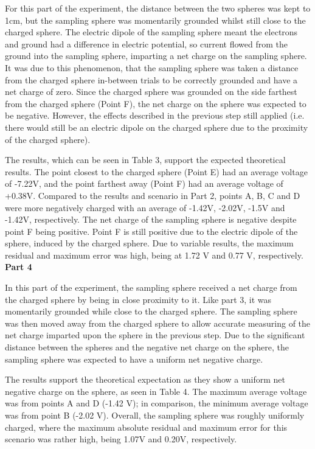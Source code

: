 For this part of the experiment, the distance between the two spheres was kept to 1cm, but the sampling sphere was momentarily grounded whilst still close to the charged sphere. The electric dipole of the sampling sphere meant the electrons and ground had a difference in electric potential, so current flowed from the ground into the sampling sphere, imparting a net charge on the sampling sphere. It was due to this phenomenon, that the sampling sphere was taken a distance from the charged sphere in-between trials to be correctly grounded and have a net charge of zero. Since the charged sphere was grounded on the side farthest from the charged sphere (Point F), the net charge on the sphere was expected to be negative. However, the effects described in the previous step still applied (i.e. there would still be an electric dipole on the charged sphere due to the proximity of the charged sphere). 

The results, which can be seen in Table 3, support the expected theoretical results. The point closest to the charged sphere (Point E) had an average voltage of -7.22V, and the point farthest away (Point F) had an average voltage of +0.38V. Compared to the results and scenario in Part 2, points A, B, C and D were more negatively charged with an average of -1.42V, -2.02V, -1.5V and  -1.42V, respectively. The net charge of the sampling sphere is negative despite point F being positive. Point F is still positive due to the electric dipole of the sphere, induced by the charged sphere. Due to variable results, the maximum residual and maximum error was high, being at 1.72 V and 0.77 V, respectively.\\
\textbf{Part 4}

In this part of the experiment, the sampling sphere received a net charge from the charged sphere by being in close proximity to it. Like part 3, it was momentarily grounded while close to the charged sphere. The sampling sphere was then moved away from the charged sphere to allow accurate measuring of  the net charge imparted upon the sphere in the previous step. Due to the significant distance between the spheres and the negative net charge on the sphere, the sampling sphere was expected to have a uniform net negative charge.

The results support the theoretical expectation as they show a uniform net negative charge on the sphere, as seen in Table 4. The maximum average voltage was from points A and D (-1.42 V); in comparison, the minimum average voltage was from point B (-2.02 V). Overall, the sampling sphere was roughly uniformly charged, where the maximum absolute residual and maximum error for this scenario was rather high, being 1.07V and 0.20V, respectively.

